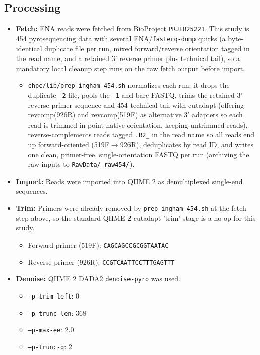 \documentclass[11pt,a4paper]{article}
\begin{document}
\subsection{Processing}
\begin{itemize}
\item \textbf{Fetch:} ENA reads were fetched from BioProject \texttt{PRJEB25221}. This study is 454 pyrosequencing data with several ENA/\texttt{fasterq-dump} quirks (a byte-identical duplicate file per run, mixed forward/reverse orientation tagged in the read name, and a retained 3' reverse primer plus technical tail), so a mandatory local cleanup step runs on the raw fetch output before import.
  \begin{itemize}
  \item \texttt{chpc/lib/prep\_ingham\_454.sh} normalizes each run: it drops the duplicate \texttt{\_2} file, pools the \texttt{\_1} and bare FASTQ, trims the retained 3' reverse-primer sequence and 454 technical tail with cutadapt (offering revcomp(926R) and revcomp(519F) as alternative 3' adapters so each read is trimmed in point native orientation, keeping untrimmed reads), reverse-complements reads tagged \texttt{.R2\_} in the read name so all reads end up forward-oriented (519F$\rightarrow$926R), deduplicates by read ID, and writes one clean, primer-free, single-orientation FASTQ per run (archiving the raw inputs to \texttt{RawData/\_raw454/}).
  \end{itemize}
\item \textbf{Import:} Reads were imported into QIIME 2 as demultiplexed single-end sequences.
\item \textbf{Trim:} Primers were already removed by \texttt{prep\_ingham\_454.sh} at the fetch step above, so the standard QIIME 2 cutadapt 'trim' stage is a no-op for this study.
  \begin{itemize}
  \item Forward primer (519F): \texttt{CAGCAGCCGCGGTAATAC}
  \item Reverse primer (926R): \texttt{CCGTCAATTCCTTTGAGTTT}
  \end{itemize}
\item \textbf{Denoise:} QIIME 2 DADA2 \texttt{denoise-pyro} was used.
  \begin{itemize}
  \item \texttt{--p-trim-left}: 0
  \item \texttt{--p-trunc-len}: 368
  \item \texttt{--p-max-ee}: 2.0
  \item \texttt{--p-trunc-q}: 2
  \end{itemize}
\end{itemize}
\end{document}
